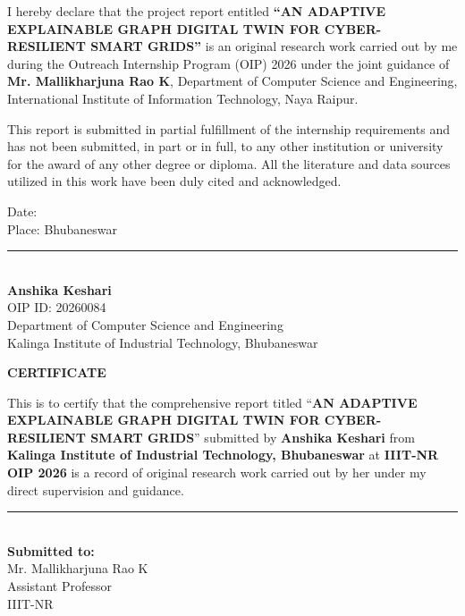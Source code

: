 \documentclass[12pt,a4paper]{report}
\begin{document}
I hereby declare that the project report entitled \textbf{``AN ADAPTIVE EXPLAINABLE GRAPH DIGITAL TWIN FOR CYBER-RESILIENT SMART GRIDS''} is an original research work carried out by me during the Outreach Internship Program (OIP) 2026 under the joint guidance of \textbf{Mr. Mallikharjuna Rao K}, Department of Computer Science and Engineering, International Institute of Information Technology, Naya Raipur.

This report is submitted in partial fulfillment of the internship requirements and has not been submitted, in part or in full, to any other institution or university for the award of any other degree or diploma. All the literature and data sources utilized in this work have been duly cited and acknowledged.

\vspace{3cm}
\noindent
\begin{minipage}[t]{0.45\textwidth}
\raggedright
Date: \\[0.4cm]
Place: Bhubaneswar
\end{minipage}
\hfill
\begin{minipage}[t]{0.5\textwidth}
\centering
\rule{6cm}{0.4pt} \\[0.2cm]
\textbf{Anshika Keshari} \\
OIP ID: 20260084 \\
Department of Computer Science and Engineering \\
Kalinga Institute of Industrial Technology, Bhubaneswar
\end{minipage}

\newpage
\thispagestyle{empty}
\vspace*{2cm}
\begin{center}
    {\Huge \textbf{CERTIFICATE}}
\end{center}
\vspace{1.5cm}

This is to certify that the comprehensive report titled ``\textbf{AN ADAPTIVE EXPLAINABLE GRAPH DIGITAL TWIN FOR CYBER-RESILIENT SMART GRIDS}'' submitted by \textbf{Anshika Keshari} from \textbf{Kalinga Institute of Industrial Technology, Bhubaneswar} at \textbf{IIIT-NR OIP 2026} is a record of original research work carried out by her under my direct supervision and guidance.

\vspace{4cm}
\hfill
\begin{minipage}{0.45\textwidth}
    \centering
    \rule{7cm}{0.4pt} \\
    \vspace{0.3cm}
    \textbf{Submitted to:} \\
    \vspace{0.2cm}
    Mr. Mallikharjuna Rao K \\
    Assistant Professor \\
    IIIT-NR
\end{minipage}
\end{document}
